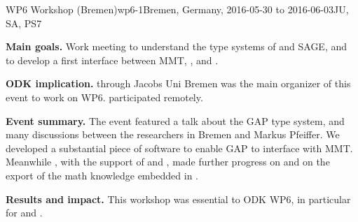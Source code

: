 \begin{event}{WP6 Workshop (Bremen)}{wp6-1}{Bremen, Germany, 2016-05-30 to 2016-06-03}{JU, SA, PS}{7}{}

\textbf{Main goals.} Work meeting to understand the type systems of \GAP and
SAGE, and to develop a first interface between MMT, \GAP, and \Sage.

\textbf{ODK implication.} \ODK through Jacobs Uni Bremen was the main
organizer of this event to work on WP6. \PS participated remotely.

\textbf{Event summary.} The event featured a talk about the GAP type
system, and many discussions between the researchers in Bremen and
Markus Pfeiffer. We developed a substantial piece of software to
enable GAP to interface with MMT. Meanwhile , with the
support of  and , made further progress on
 and on
the export of the math knowledge embedded in \Sage.

\textbf{Results and impact.}  This workshop was essential to ODK WP6,
in particular for  and
.

\end{event}
